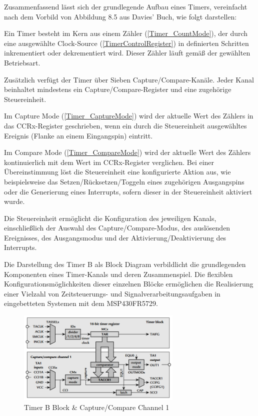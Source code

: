 Zusammenfassend l\"asst sich der grundlegende Aufbau eines Timers, vereinfacht nach dem Vorbild von Abbildung 8.5 aus Davies' Buch, wie folgt darstellen:

Ein Timer besteht im Kern aus einem Z\"ahler (\ref{Timer_CountMode}), der durch eine ausgew\"ahlte Clock-Source (\ref{TimerControlRegister}) in definierten Schritten inkrementiert oder dekrementiert wird. Dieser Z\"ahler l\"auft gem\"a{\ss} der gew\"ahlten Betriebsart.

Zus\"atzlich verf\"ugt der Timer \"uber Sieben Capture/Compare-Kan\"ale. Jeder Kanal beinhaltet mindestens ein Capture/Compare-Register und eine zugeh\"orige Steuereinheit.

Im Capture Mode (\ref{Timer_CaptureMode}) wird der aktuelle Wert des Z\"ahlers in das CCRx-Register geschrieben, wenn ein durch die Steuereinheit ausgew\"ahltes Ereignis (\zB Flanke an einem Eingangspin) eintritt.

Im Compare Mode (\ref{Timer_CompareMode}) wird der aktuelle Wert des Z\"ahlers kontinuierlich mit dem Wert im CCRx-Register verglichen. Bei einer \"Ubereinstimmung l\"ost die Steuereinheit eine konfigurierte Aktion aus, wie beispielsweise das Setzen/R\"ucksetzen/Toggeln eines zugeh\"origen Ausgangspins oder die Generierung eines Interrupts, sofern dieser in der Steuereinheit aktiviert wurde.

Die Steuereinheit erm\"oglicht die Konfiguration des jeweiligen Kanals, einschließlich der Auswahl des Capture/Compare-Modus, des ausl\"osenden Ereignisses, des Ausgangsmodus und der Aktivierung/Deaktivierung des Interrupts.

Die Darstellung  des Timer B als Block Diagram verbildlicht die grundlegenden Komponenten eines Timer-Kanals und deren Zusammenspiel. Die flexiblen Konfigurationsm\"oglichkeiten dieser einzelnen Bl\"ocke erm\"oglichen die Realisierung einer Vielzahl von Zeitsteuerungs- und Signalverarbeitungsaufgaben in eingebetteten Systemen mit dem MSP430FR5729.

\begin{figure}[h!]
	\centering
	\includegraphics[width=0.7\textwidth]{../Bilder/BlockDiagram_TimerB.png}
	\caption{Timer B Block \& Capture/Compare Channel 1\\}
	\label{fig:BlockDiagramm_Timer}
\end{figure}


